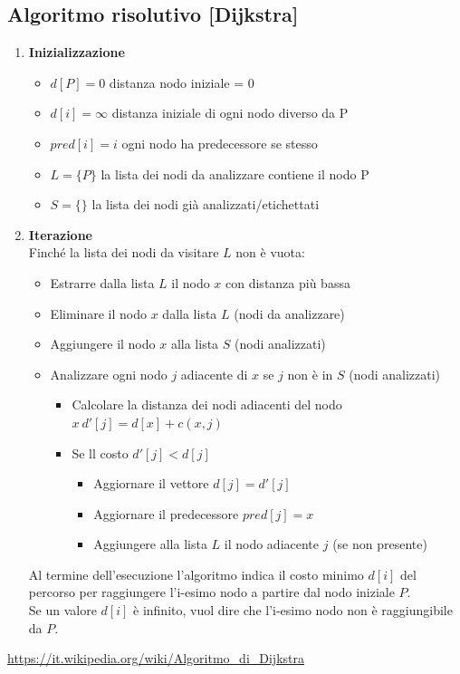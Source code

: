 \documentclass[12pt,a4paper]{article}
\begin{document}
\subsection{Algoritmo risolutivo [Dijkstra]}
\begin{enumerate}
\item \textbf{Inizializzazione}
\begin{itemize}
\item $d[P]=0$ distanza nodo iniziale = 0
\item $d[i]=\infty$ distanza iniziale di ogni nodo diverso da P
\item $pred[i] = i$ ogni nodo ha predecessore se stesso
\item $L = \{P\}$ la lista dei nodi da analizzare contiene il nodo P
\item $S=\{\}$ la lista dei nodi già analizzati/etichettati
\end{itemize}
\item \textbf{Iterazione}\\
Finché la lista dei nodi da visitare $L$ non è vuota:
\begin{itemize}
\item Estrarre dalla lista $L$ il nodo $x$ con distanza più bassa
\item Eliminare il nodo $x$ dalla lista $L$ (nodi da analizzare)
\item Aggiungere il nodo $x$ alla lista $S$ (nodi analizzati)
\item Analizzare ogni nodo $j$ adiacente di $x$ se $j$ non è in $S$ (nodi analizzati)
\begin{itemize}
\item Calcolare la distanza dei nodi adiacenti del nodo $x \ d'[j] = d[x] + c(x,j)$
\item Se ll costo $d'[j]<d[j]$
\begin{itemize}
\item Aggiornare il vettore $d[j]=d'[j]$
\item Aggiornare il predecessore $pred[j]=x$
\item Aggiungere alla lista $L$ il nodo adiacente $j$ (se non presente)
\end{itemize}
\end{itemize}
\end{itemize}
Al termine dell'esecuzione l'algoritmo indica il costo minimo $d[i]$ del percorso per raggiungere l'i-esimo nodo a partire dal nodo iniziale $P$.\\Se un valore $d[i]$ è infinito, vuol dire che l'i-esimo nodo non è raggiungibile da $P$.
\end{enumerate}
\url{https://it.wikipedia.org/wiki/Algoritmo_di_Dijkstra}
\end{document}
